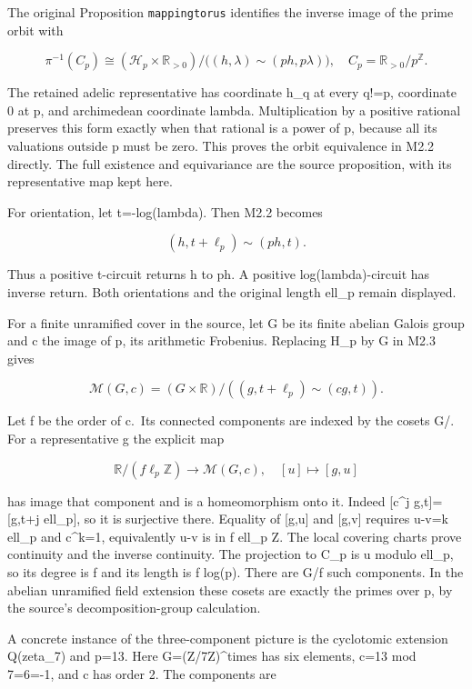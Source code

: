 The original Proposition \texttt{mappingtorus} identifies the inverse
image of the prime orbit with

\[
\pi^{-1}(C_p)\cong
(\mathcal H_p\times\mathbb R_{>0})/\big((h,\lambda)\sim(ph,p\lambda)\big),
\quad C_p=\mathbb R_{>0}/p^{\mathbb Z}.
\tag{M2.2}
\]

The retained adelic representative has coordinate h\_q at every q!=p,
coordinate 0 at p, and archimedean coordinate lambda. Multiplication by
a positive rational preserves this form exactly when that rational is a
power of p, because all its valuations outside p must be zero. This
proves the orbit equivalence in M2.2 directly. The full existence and
equivariance are the source proposition, with its representative map
kept here.

For orientation, let t=-log(lambda). Then M2.2 becomes

\[
(h,t+\ell_p)\sim(ph,t).
\tag{M2.3}
\]

Thus a positive t-circuit returns h to ph. A positive
log(lambda)-circuit has inverse return. Both orientations and the
original length ell\_p remain displayed.

For a finite unramified cover in the source, let G be its finite abelian
Galois group and c the image of p, its arithmetic Frobenius. Replacing
H\_p by G in M2.3 gives

\[
\mathcal M(G,c)= (G\times\mathbb R)/((g,t+\ell_p)\sim(cg,t)).
\tag{M2.4}
\]

Let f be the order of c.~Its connected components are indexed by the
cosets G/. For a representative g the explicit map

\[
\mathbb R/(f\ell_p\mathbb Z)\longrightarrow\mathcal M(G,c),
\quad [u]\longmapsto[g,u]
\tag{M2.5}
\]

has image that component and is a homeomorphism onto it. Indeed
{[}c\^{}j g,t{]}={[}g,t+j ell\_p{]}, so it is surjective there. Equality
of {[}g,u{]} and {[}g,v{]} requires u-v=k ell\_p and c\^{}k=1,
equivalently u-v is in f ell\_p Z. The local covering charts prove
continuity and the inverse continuity. The projection to C\_p is u
modulo ell\_p, so its degree is f and its length is f log(p). There are
\textbar G\textbar/f such components. In the abelian unramified field
extension these cosets are exactly the primes over p, by the source's
decomposition-group calculation.

A concrete instance of the three-component picture is the cyclotomic
extension Q(zeta\_7) and p=13. Here G=(Z/7Z)\^{}times has six elements,
c=13 mod 7=6=-1, and c has order 2. The components are

